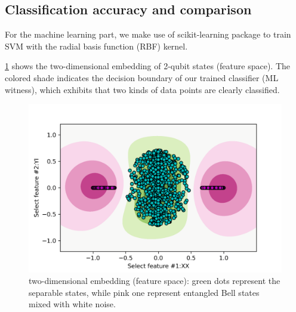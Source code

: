 \documentclass[
reprint,
aps,
pra,
floatfix,
]{revtex4-2}
\theoremstyle{plain}
\theoremstyle{definition}
\begin{document}
\subsection{Classification accuracy and comparison}

For the machine learning part, we make use of scikit-learning package \cite{pedregosaScikitlearnMachineLearning2011} to train SVM with the radial basis function (RBF) kernel.


\cref{fig:feature_space} shows the two-dimensional embedding of  2-qubit states (feature space).
The colored shade indicates the decision boundary of our trained classifier (ML witness),
which exhibits that two kinds of data points are clearly classified.
\begin{figure}[!ht]
	\centering
	\includegraphics[width=.9\linewidth]{./Code/feature_space_2d.png}
	\caption{two-dimensional embedding (feature space): green dots represent the separable states, while pink one represent entangled Bell states mixed with white noise.}
	\label{fig:feature_space}
\end{figure}
\end{document}
